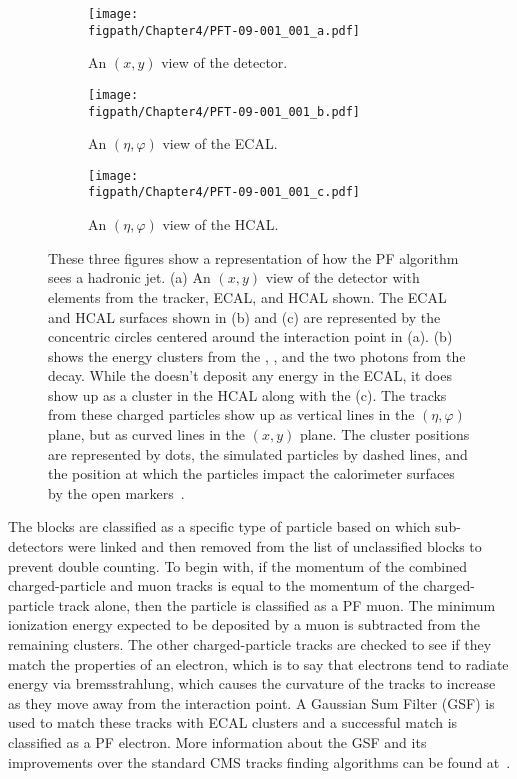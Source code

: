 \begin{figure}[!hbt]
    \centering
    \begin{subfigure}[t]{0.53\textwidth}
        \texttt{[image: \\figpath/Chapter4/PFT-09-001\_001\_a.pdf]}
        \caption{An $(x,y)$ view of the detector.}
        \label{fig:PF_linking_a}
    \end{subfigure}

    \begin{subfigure}[t]{0.4655\textwidth}
        \texttt{[image: \\figpath/Chapter4/PFT-09-001\_001\_b.pdf]}
        \caption{An $(\eta,\varphi)$ view of the ECAL.}
        \label{fig:PF_linking_b}
    \end{subfigure}
    \begin{subfigure}[t]{0.4655\textwidth}
        \texttt{[image: \\figpath/Chapter4/PFT-09-001\_001\_c.pdf]}
        \caption{An $(\eta,\varphi)$ view of the HCAL.}
        \label{fig:PF_linking_c}
    \end{subfigure}
    \caption{These three figures show a representation of how the PF algorithm sees a hadronic jet. (a) An $(x,y)$ view of the detector with elements from the tracker, ECAL, and HCAL shown. The ECAL and HCAL surfaces shown in (b) and (c) are represented by the concentric circles centered around the interaction point in (a). (b) shows the energy clusters from the \PKzL, \Pgpm, and the two photons from the \Pgpz decay. While the \Pgpp doesn't deposit any energy in the ECAL, it does show up as a cluster in the HCAL along with the \Pgpm (c). The tracks from these charged particles show up as vertical lines in the $(\eta,\varphi)$ plane, but as curved lines in the $(x,y)$ plane. The cluster positions are represented by dots, the simulated particles by dashed lines, and the position at which the particles impact the calorimeter surfaces by the open markers~\cite{CMS-PAS-PFT-09-001}.}
    \label{fig:PF_linking}
\end{figure}

\clearpage

The blocks are classified as a specific type of particle based on which sub-detectors were linked and then removed from the list of unclassified blocks to prevent double counting.
To begin with, if the momentum of the combined charged-particle and muon tracks is equal to the momentum of the charged-particle track alone, then the particle is classified as a PF muon.
The minimum ionization energy expected to be deposited by a muon is subtracted from the remaining clusters.
The other charged-particle tracks are checked to see if they match the properties of an electron, which is to say that electrons tend to radiate energy via bremsstrahlung, which causes the curvature of the tracks to increase as they move away from the interaction point.
A Gaussian Sum Filter (GSF) is used to match these tracks with ECAL clusters and a successful match is classified as a PF electron.
More information about the GSF and its improvements over the standard CMS tracks finding algorithms can be found at~\cite{ElectronGSF}.


